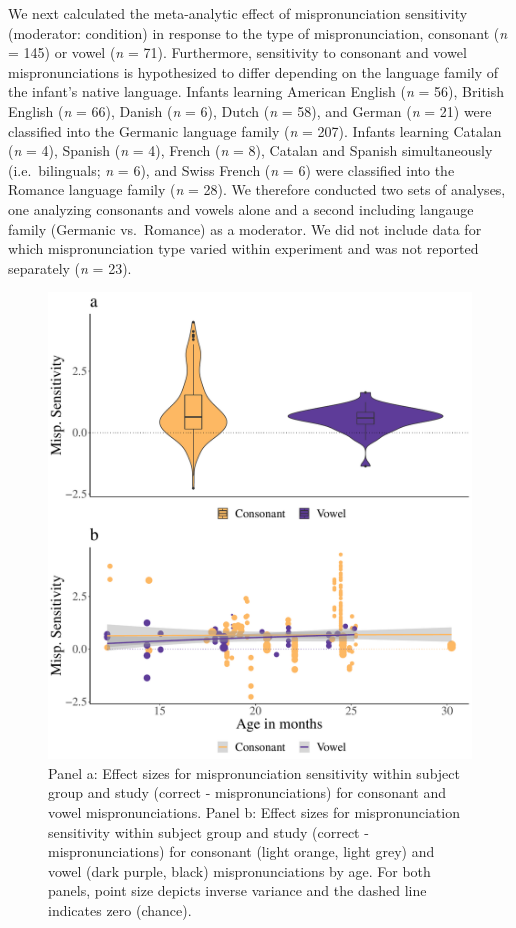 \documentclass[
  english,
  man, noextraspace]{apa6}
\begin{document}
We next calculated the meta-analytic effect of mispronunciation sensitivity (moderator: condition) in response to the type of mispronunciation, consonant (\emph{n} = 145) or vowel (\emph{n} = 71). Furthermore, sensitivity to consonant and vowel mispronunciations is hypothesized to differ depending on the language family of the infant's native language. Infants learning American English (\emph{n} = 56), British English (\emph{n} = 66), Danish (\emph{n} = 6), Dutch (\emph{n} = 58), and German (\emph{n} = 21) were classified into the Germanic language family (\emph{n} = 207). Infants learning Catalan (\emph{n} = 4), Spanish (\emph{n} = 4), French (\emph{n} = 8), Catalan and Spanish simultaneously (i.e.~bilinguals; \emph{n} = 6), and Swiss French (\emph{n} = 6) were classified into the Romance language family (\emph{n} = 28). We therefore conducted two sets of analyses, one analyzing consonants and vowels alone and a second including langauge family (Germanic vs.~Romance) as a moderator. We did not include data for which mispronunciation type varied within experiment and was not reported separately (\emph{n} = 23).

\begin{figure}
\centering
\includegraphics{VonHolzenBergmann_MPMetaAnalysis_files/figure-latex/PlotMispType-1.pdf}
\caption{\label{fig:PlotMispType}Panel a: Effect sizes for mispronunciation sensitivity within subject group and study (correct - mispronunciations) for consonant and vowel mispronunciations. Panel b: Effect sizes for mispronunciation sensitivity within subject group and study (correct - mispronunciations) for consonant (light orange, light grey) and vowel (dark purple, black) mispronunciations by age. For both panels, point size depicts inverse variance and the dashed line indicates zero (chance).}
\end{figure}
\end{document}
